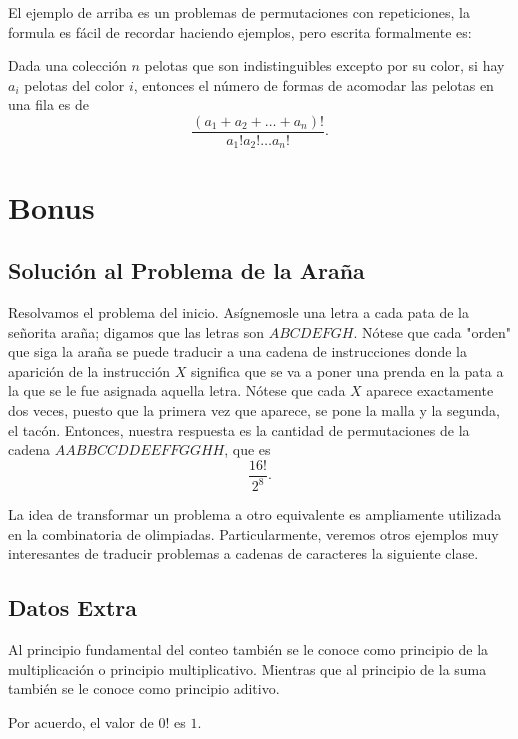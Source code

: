 El ejemplo de arriba es un problemas de permutaciones con 
repeticiones, la formula es fácil de recordar haciendo ejemplos, 
pero escrita formalmente es:

\begin{theorem}
    Dada una colección $n$ pelotas que son indistinguibles 
    excepto por su color, si hay $a_i$ pelotas del color $i$, 
    entonces el número de formas de acomodar las pelotas en 
    una fila es de 
    \[
    \frac{\left(a_1+a_2+\dots+a_n\right)!}{a_1!a_2!\dots a_n!}.
    \]
\end{theorem}

\section{Bonus}

\subsection{Solución al Problema de la Araña}

Resolvamos el problema del inicio. Asígnemosle una letra a 
cada pata de la señorita araña; digamos que las letras son 
$ABCDEFGH$. Nótese que cada "orden" que siga la araña 
se puede traducir a una cadena de instrucciones donde la 
aparición de la instrucción $X$ significa que se va a poner una 
prenda en la pata a la que se le fue asignada aquella letra. Nótese 
que cada $X$ aparece exactamente dos veces, puesto 
que la primera vez que aparece, se pone la malla y la segunda, 
el tacón. Entonces, nuestra respuesta es la cantidad de 
permutaciones de la cadena $AABBCCDDEEFFGGHH$, que es 
\[\frac{16!}{2^8}.\]

La idea de transformar un problema a otro equivalente es 
ampliamente utilizada en la combinatoria de olimpiadas. 
Particularmente, veremos otros ejemplos muy interesantes de 
traducir problemas a cadenas de caracteres la siguiente clase.   

\subsection{Datos Extra}

Al principio fundamental del conteo también se le conoce como 
principio de la multiplicación o principio multiplicativo. 
Mientras que al principio de la suma también se le conoce como 
principio aditivo.

Por acuerdo, el valor de $0!$ es $1$.

